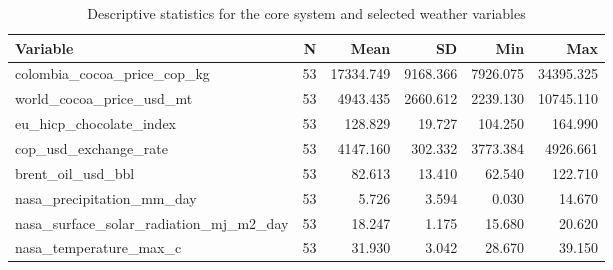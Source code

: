 \begin{table}
\caption{Descriptive statistics for the core system and selected weather variables}
\label{tab:descriptive_stats}
\begin{tabular}{lrrrrr}
\toprule
Variable & N & Mean & SD & Min & Max \\
\midrule
colombia_cocoa_price_cop_kg & 53 & 17334.749 & 9168.366 & 7926.075 & 34395.325 \\
world_cocoa_price_usd_mt & 53 & 4943.435 & 2660.612 & 2239.130 & 10745.110 \\
eu_hicp_chocolate_index & 53 & 128.829 & 19.727 & 104.250 & 164.990 \\
cop_usd_exchange_rate & 53 & 4147.160 & 302.332 & 3773.384 & 4926.661 \\
brent_oil_usd_bbl & 53 & 82.613 & 13.410 & 62.540 & 122.710 \\
nasa_precipitation_mm_day & 53 & 5.726 & 3.594 & 0.030 & 14.670 \\
nasa_surface_solar_radiation_mj_m2_day & 53 & 18.247 & 1.175 & 15.680 & 20.620 \\
nasa_temperature_max_c & 53 & 31.930 & 3.042 & 28.670 & 39.150 \\
\bottomrule
\end{tabular}
\end{table}
